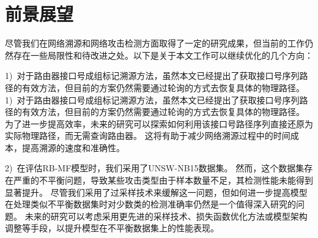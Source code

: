 \section{前景展望}
尽管我们在网络溯源和网络攻击检测方面取得了一定的研究成果，但当前的工作仍然存在一些局限性和待改进之处。以下是关于本文工作可以继续优化的几个方向：\par

1)~对于路由器接口号成组标记溯源方法，虽然本文已经提出了获取接口号序列路径的有效方法，但目前的方案仍然需要通过轮询的方式去恢复具体的物理路径。
1)~对于路由器接口号成组标记溯源方法，虽然本文已经提出了获取接口号序列路径的有效方法，但目前的方案仍然需要通过轮询的方式去恢复具体的物理路径。
为了进一步提高效率，未来的研究可以探索如何利用该接口号路径序列直接还原为实际物理路径，而无需查询路由器。
这将有助于减少网络溯源过程中的时间成本，提高溯源的速度和准确性。\par

2)~在评估RB-MF模型时，我们采用了UNSW-NB15数据集。
然而，这个数据集存在严重的不平衡问题，导致某些攻击类型由于样本数量不足，其检测性能未能得到显著提升。
尽管我们采用了过采样技术来缓解这一问题，但如何进一步提高模型在处理类似不平衡数据集时对少数类的检测准确率仍然是一个值得深入研究的问题。
未来的研究可以考虑采用更先进的采样技术、损失函数优化方法或模型架构调整等手段，以提升模型在不平衡数据集上的性能表现。\par